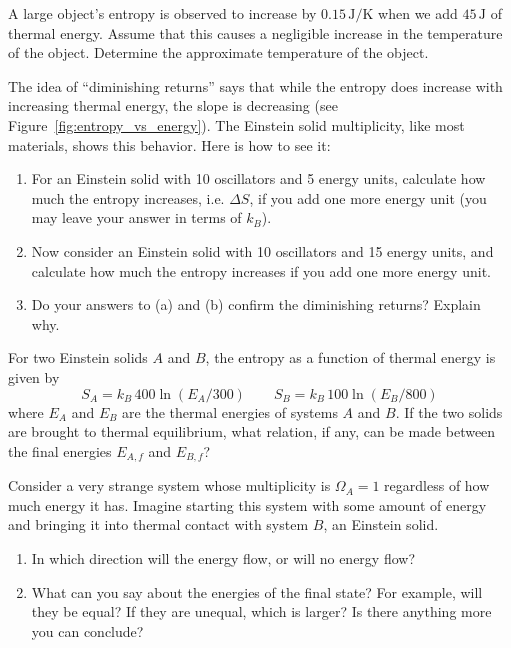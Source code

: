 \begin{exercise}
A large object's entropy is observed to increase by $0.15\,\text{J/K}$
when we add $45\,\text{J}$ of thermal energy.  Assume that this causes
a negligible increase in the temperature of the object.  Determine
the approximate temperature of the object.
\label{prob:tempoflargeobject}
\end{exercise}

\begin{exercise}
  The idea of ``diminishing returns'' says that while the entropy does
  increase with increasing thermal energy, the slope is decreasing
  (see Figure~\ref{fig:entropy_vs_energy}).  The Einstein solid
  multiplicity, like most materials, shows this behavior.  Here is how
  to see it:
  \begin{enumerate}
  \item For an Einstein solid with 10 oscillators and 5 energy units,
    calculate how much the entropy increases, i.e. $\Delta S$, if you
    add one more energy unit (you may leave your answer in terms of
    $k_B$).
  \item Now consider an Einstein solid with 10 oscillators and 15
    energy units, and calculate how much the entropy increases if you
    add one more energy unit.
  \item Do your answers to (a) and (b) confirm the diminishing
    returns?  Explain why.
\end{enumerate}
\label{prob:diminishing}
\end{exercise}

\begin{exercise}
For two Einstein solids $A$ and $B$, the entropy as a function of
thermal energy is given by 
\[
S_A= k_B\, 400\ln(E_A/300) \qquad S_B = k_B\, 100\ln(E_B/800)
\]
where $E_A$ and $E_B$ are the thermal energies of systems $A$ and
$B$.  If the two solids are brought to thermal equilibrium, what
relation, if any, can be made between the final energies $E_{A,f}$ and
$E_{B,f}$? 
\label{prob:entropyoftwosolids}
\end{exercise}

\begin{exercise}
Consider a very strange system whose multiplicity is $\Omega_A=1$
regardless of how much energy it has.  Imagine starting this system
with some amount of energy and bringing it into thermal contact with
system $B$, an Einstein solid.
\begin{enumerate}
\item In which direction will the energy flow, or will no energy flow?
\item What can you say about the energies of the final state?  For
  example, will they be equal?  If they are unequal, which is larger?
  Is there anything more you can conclude?
\end{enumerate}
\label{prob:strangesystem}
\end{exercise}


